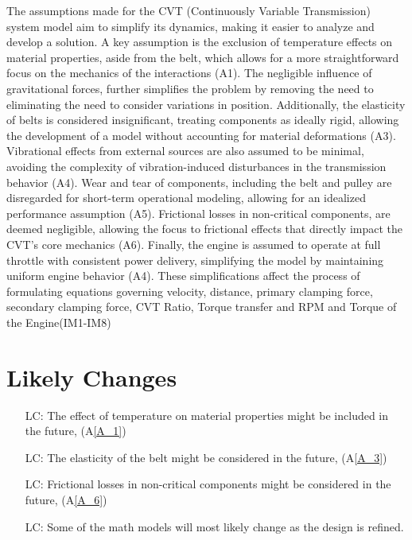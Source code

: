 \documentclass[12pt]{article}
\newcounter{lcnum} %
\begin{document}
The assumptions made for the CVT (Continuously Variable Transmission) system model aim to simplify its dynamics, making it easier to analyze and develop a solution. 
A key assumption is the exclusion of temperature effects on material properties, aside from the belt, which allows for a more straightforward focus on the mechanics of the interactions (A1). 
The negligible influence of gravitational forces, further simplifies the problem by removing the need to eliminating the need to consider variations in position. 
Additionally, the elasticity of belts is considered insignificant, treating components as ideally rigid, allowing the development of a model without accounting for material deformations (A3). 
Vibrational effects from external sources are also assumed to be minimal, avoiding the complexity of vibration-induced disturbances in the transmission behavior (A4). 
Wear and tear of components, including the belt and pulley are disregarded for short-term operational modeling, allowing for an idealized performance assumption (A5). 
Frictional losses in non-critical components, are deemed negligible, allowing the focus to frictional effects that directly impact the CVT’s core mechanics (A6). 
Finally, the engine is assumed to operate at full throttle with consistent power delivery, simplifying the model by maintaining uniform engine behavior (A4).
These simplifications affect the process of formulating equations governing velocity, distance, primary clamping force, secondary clamping force, CVT Ratio, Torque transfer and RPM and Torque of the Engine(IM1-IM8)

\section{Likely Changes}    

\noindent \begin{itemize}

\item[LC\refstepcounter{lcnum}\thelcnum\label{LC_1}:] The effect of temperature on material properties might be included in the future, (A\ref{A_1})
\item[LC\refstepcounter{lcnum}\thelcnum\label{LC_2}:] The elasticity of the belt might be considered in the future, (A\ref{A_3})
\item[LC\refstepcounter{lcnum}\thelcnum\label{LC_3}:] Frictional losses in non-critical components might be considered in the future, (A\ref{A_6})
\item[LC\refstepcounter{lcnum}\thelcnum\label{LC_4}:] Some of the math models will most likely change as the design is refined.

\end{itemize}
\end{document}

